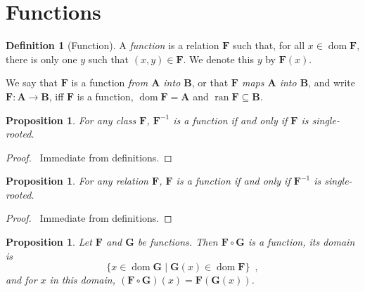 \documentclass{book}
\let\qed\relax
\newtheorem{prop}[ax]{Proposition}
\theoremstyle{definition}
\newtheorem{df}[ax]{Definition}
\newcommand{\dom}{\ensuremath{\operatorname{dom}}}
\newcommand{\ran}{\ensuremath{\operatorname{ran}}}
\begin{document}
\section{Functions}

\begin{df}[Function]
A \emph{function} is a relation $\mathbf{F}$ such that, for all $x \in \dom \mathbf{F}$, there is only one $y$ such that $(x,y) \in \mathbf{F}$. We denote this $y$ by $\mathbf{F}(x)$.

We say that $\mathbf{F}$ is a function \emph{from $\mathbf{A}$ into $\mathbf{B}$}, or that \emph{$\mathbf{F}$ maps $\mathbf{A}$ into $\mathbf{B}$}, and write $\mathbf{F} : \mathbf{A} \rightarrow \mathbf{B}$, iff $\mathbf{F}$ is a function, $\dom \mathbf{F} = \mathbf{A}$ and $\ran \mathbf{F} \subseteq \mathbf{B}$.
\end{df}

\begin{prop}
\label{prop:invfunc}
For any class $\mathbf{F}$, $\mathbf{F}^{-1}$ is a function if and only if $\mathbf{F}$ is single-rooted.
\end{prop}

\begin{proof}
\pf\ Immediate from definitions. \qed
\end{proof}

\begin{prop}
\label{prop:invsingroot}
For any relation $\mathbf{F}$, $\mathbf{F}$ is a function if and only if $\mathbf{F}^{-1}$ is single-rooted.
\end{prop}

\begin{proof}
\pf\ Immediate from definitions. \qed
\end{proof}

\begin{prop}
Let $\mathbf{F}$ and $\mathbf{G}$ be functions. Then $\mathbf{F} \circ \mathbf{G}$ is a function, its domain is
\[ \{ x \in \dom \mathbf{G} \mid \mathbf{G}(x) \in \dom \mathbf{F} \} \enspace , \]
and for $x$ in this domain, $(\mathbf{F} \circ \mathbf{G})(x) = \mathbf{F}(\mathbf{G}(x))$.
\end{prop}
\end{document}
